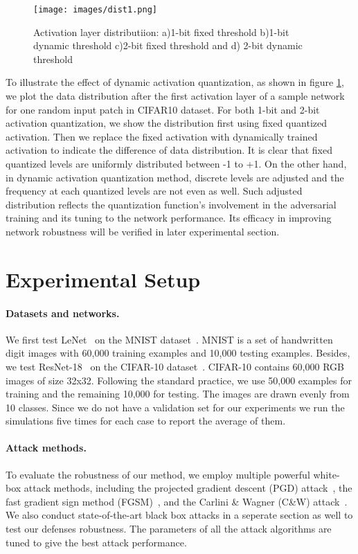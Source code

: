 \documentclass{article}
\begin{document}
\begin{figure}[ht]
  \centering
   \texttt{[image: images/dist1.png]}
   \caption{Activation layer distributiion: a)1-bit fixed threshold b)1-bit dynamic threshold c)2-bit fixed threshold and d) 2-bit dynamic threshold}
   \label{dis}
\end{figure}

To illustrate the effect of dynamic activation quantization, as shown in figure \ref{dis}, we plot the data distribution after the first activation layer of a sample network for one random input patch in CIFAR10 dataset. For both 1-bit and 2-bit activation quantization, we show the distribution first using fixed quantized activation. Then we replace the fixed activation with dynamically trained activation to indicate the difference of data distribution. It is clear that fixed quantized levels are uniformly distributed between -1 to +1. On the other hand, in dynamic activation quantization method, discrete levels are adjusted and the frequency at each quantized levels are not even as well. Such adjusted distribution reflects the quantization function's involvement in the adversarial training and its tuning to the network performance. Its efficacy in improving network robustness will be verified in later experimental section. 


\section{Experimental Setup}



\paragraph{Datasets and networks.}
We first test LeNet~\cite{lecun2015lenet} on the MNIST dataset~\cite{lecun1995convolutional}. MNIST is a set of handwritten digit images with 60,000 training examples and 10,000 testing examples. Besides, we test ResNet-18~\cite{he2016deep} on the CIFAR-10 dataset~\cite{krizhevsky2010cifar}. CIFAR-10 contains 60,000 RGB images of size 32x32. Following the standard practice, we use 50,000 examples for training and the remaining 10,000 for testing. The images are drawn evenly from 10 classes. Since we do not have a validation set for our experiments we run the simulations five times for each case to report the average of them. 

\paragraph{Attack methods.}
To evaluate the robustness of our method, we employ multiple powerful white-box attack methods, including the projected gradient descent (PGD) attack~\cite{madry2017towards}, the fast gradient sign method (FGSM)~\cite{goodfellow2014explaining}, and the Carlini \& Wagner (C\&W) attack~\cite{carlini2017towards}. We also conduct state-of-the-art black box attacks  in a seperate section as well \cite{papernot2017practical,chen2017zoo} to test our defenses robustness. The parameters of all the attack algorithms are tuned to give the best attack performance.
\end{document}
